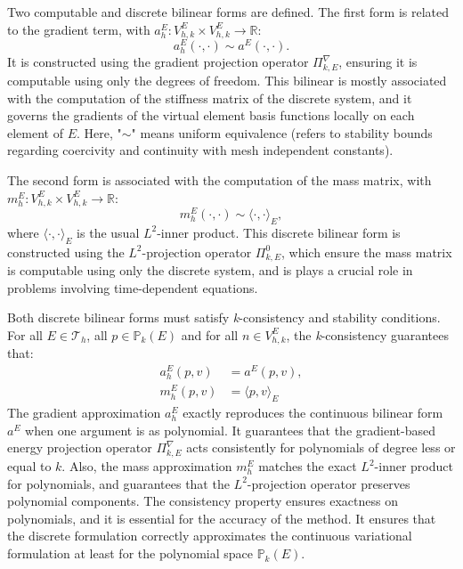 \documentclass{article}
\begin{document}
Two computable and discrete bilinear forms are defined. The first form is related to the gradient term, with $a^E_h: V^E_{h,k} \times V^E_{h,k}\longrightarrow \mathbb{R}$:
\begin{equation}
    \nonumber
    a^E_h(\cdot, \cdot) \sim  a^E(\cdot,  \cdot).
\end{equation}
It is constructed using the gradient projection operator $\Pi^\nabla_{k,E}$, ensuring it is computable using only the degrees of freedom. This bilinear is mostly associated with the computation of the stiffness matrix of the discrete system, and it governs the gradients of the virtual element basis functions locally on each element of $E$. Here, "$\sim$" means uniform equivalence (refers to stability bounds regarding coercivity and continuity with mesh independent constants).

The second form is associated with the computation of the mass matrix, with $m^E_h: V^E_{h,k} \times V^E_{h,k}\longrightarrow \mathbb{R}$:
\begin{equation}
    \nonumber
    m^E_h(\cdot, \cdot) \sim  \langle \cdot, \cdot\rangle_E,
\end{equation}
where $\langle \cdot, \cdot \rangle_E$ is the usual $L^2$-inner product. This discrete bilinear form is constructed using the $L^2$-projection operator $\Pi^0_{k,E}$, which ensure the mass matrix is computable using only the discrete system,  and is plays a crucial role in problems involving time-dependent equations.

Both discrete bilinear forms must satisfy \textit{k}-consistency and stability conditions. For all $E\in \mathcal{T}_h$, all $p \in \mathbb{P}_k(E)$ and for all $n \in V^E_{h,k}$, the \textit{k}-consistency guarantees that:
\begin{equation}
    \nonumber
    \begin{split}
        a^E_h(p,v) &= a^E(p,v), \\
        m^E_h(p,v) &= \langle p,v \rangle_E
    \end{split}
\end{equation}
The gradient approximation $a^E_h$ exactly reproduces the continuous bilinear form $a^E$ when one argument is as polynomial. It guarantees that the gradient-based energy projection operator $\Pi^\nabla_{k,E}$ acts consistently for polynomials of degree less or equal to $k$. Also, the mass approximation $m^E_h$ matches the exact $L^2$-inner product for polynomials, and guarantees that the $L^2$-projection operator preserves polynomial components. The consistency property ensures exactness on polynomials, and it is essential for the accuracy of the method. It ensures that the discrete formulation correctly approximates the continuous variational formulation at least for the polynomial space $\mathbb{P}_k(E)$.
\end{document}
